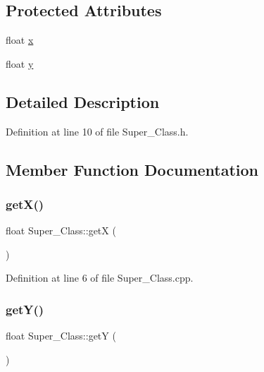 \subsection*{Protected Attributes}
\begin{DoxyCompactItemize}
\item 
float \hyperlink{class_super___class_a6c644a695141db808e5f1227537e3074}{x}
\item 
float \hyperlink{class_super___class_a340cf4d44abcfb96410f02adcb1d9208}{y}
\end{DoxyCompactItemize}


\subsection{Detailed Description}


Definition at line 10 of file Super\+\_\+\+Class.\+h.



\subsection{Member Function Documentation}
\hypertarget{class_super___class_ad003a78eaa20b2e4b2ab290f2d353829}{}\label{class_super___class_ad003a78eaa20b2e4b2ab290f2d353829} 
\subsubsection{\texorpdfstring{get\+X()}{getX()}}
{\footnotesize\ttfamily float Super\+\_\+\+Class\+::getX (\begin{DoxyParamCaption}{ }\end{DoxyParamCaption})}



Definition at line 6 of file Super\+\_\+\+Class.\+cpp.

\hypertarget{class_super___class_a9d4c62222b9bec910d8e9b600a853329}{}\label{class_super___class_a9d4c62222b9bec910d8e9b600a853329} 
\subsubsection{\texorpdfstring{get\+Y()}{getY()}}
{\footnotesize\ttfamily float Super\+\_\+\+Class\+::getY (\begin{DoxyParamCaption}{ }\end{DoxyParamCaption})}



